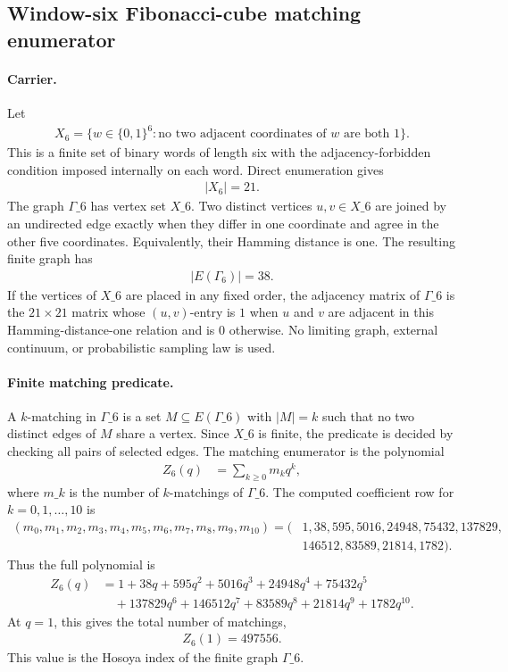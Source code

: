 \subsection{Window-six Fibonacci-cube matching enumerator}
\label{sec:window6-fibonacci-cube-matching-enumerator}

\paragraph{Carrier.}
Let
$$
\begin{aligned}
X_6=\{w\in \{0,1\}^6 : \text{no two adjacent coordinates of } w \text{ are both }1\}.
\end{aligned}
$$
This is a finite set of binary words of length six with the adjacency-forbidden condition imposed internally on each word. Direct enumeration gives
$$
\begin{aligned}
|X_6|=21.
\end{aligned}
$$
The graph \(\Gamma\_6\) has vertex set \(X\_6\). Two distinct vertices \(u,v\in X\_6\) are joined by an undirected edge exactly when they differ in one coordinate and agree in the other five coordinates. Equivalently, their Hamming distance is one. The resulting finite graph has
$$
\begin{aligned}
|E(\Gamma_6)|=38.
\end{aligned}
$$
If the vertices of \(X\_6\) are placed in any fixed order, the adjacency matrix of \(\Gamma\_6\) is the \(21\times 21\) matrix whose \((u,v)\)-entry is \(1\) when \(u\) and \(v\) are adjacent in this Hamming-distance-one relation and is \(0\) otherwise. No limiting graph, external continuum, or probabilistic sampling law is used.

\paragraph{Finite matching predicate.}
A \(k\)-matching in \(\Gamma\_6\) is a set \(M\subseteq E(\Gamma\_6)\) with \(|M|=k\) such that no two distinct edges of \(M\) share a vertex. Since \(X\_6\) is finite, the predicate is decided by checking all pairs of selected edges. The matching enumerator is the polynomial
$$
\begin{aligned}
Z_6(q)&=\sum_{k\geq 0} m_k q^k,
\end{aligned}
$$
where \(m\_k\) is the number of \(k\)-matchings of \(\Gamma\_6\). The computed coefficient row for \(k=0,1,\ldots,10\) is
$$
\begin{aligned}
(m_0,m_1,m_2,m_3,m_4,m_5,m_6,m_7,m_8,m_9,m_{10})
=(&1,38,595,5016,24948,75432,137829,\\
&146512,83589,21814,1782).
\end{aligned}
$$
Thus the full polynomial is
$$
\begin{aligned}
Z_6(q)&=1+38q+595q^2+5016q^3+24948q^4+75432q^5\\
&\quad +137829q^6+146512q^7+83589q^8+21814q^9+1782q^{10}.
\end{aligned}
$$
At \(q=1\), this gives the total number of matchings,
$$
\begin{aligned}
Z_6(1)=497556.
\end{aligned}
$$
This value is the Hosoya index of the finite graph \(\Gamma\_6\).

